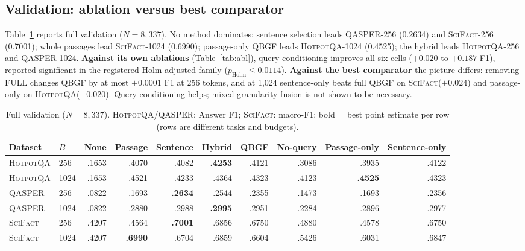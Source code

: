 \documentclass[10pt,twocolumn,letterpaper]{article}
\newcommand{\hotpot}{\textsc{HotpotQA}\xspace}
\newcommand{\qasper}{\textsc{QASPER}\xspace}
\newcommand{\scifact}{\textsc{SciFact}\xspace}
\newcommand{\SmallTable}{\footnotesize\setlength{\tabcolsep}{3.6pt}}
\begin{document}
\subsection{Validation: ablation versus best comparator}
Table~\ref{tab:val} reports full validation ($N{=}8{,}337$). No method dominates: sentence selection leads \qasper-256 (0.2634) and \scifact-256 (0.7001); whole passages lead \scifact-1024 (0.6990); passage-only QBGF leads \hotpot-1024 (0.4525); the hybrid leads \hotpot-256 and \qasper-1024. \textbf{Against its own ablations} (Table~\ref{tab:abl}), query conditioning improves all six cells ($+0.020$ to $+0.187$ F1), reported significant in the registered Holm-adjusted family ($p_{\mathrm{Holm}}\le0.0114$). \textbf{Against the best comparator} the picture differs: removing FULL changes QBGF by at most $\pm0.0001$ F1 at 256 tokens, and at 1,024 sentence-only beats full QBGF on \scifact ($+0.024$) and passage-only on \hotpot ($+0.020$). Query conditioning helps; mixed-granularity fusion is not shown to be necessary.

\begin{table}[t]\centering\SmallTable
\caption{Full validation ($N{=}8{,}337$). \hotpot/\qasper: Answer F1; \scifact: macro-F1; bold = best point estimate per row (rows are different tasks and budgets).}\label{tab:val}
\begin{tabular}{llrrrrrrrr}\toprule
Dataset & $B$ & None & Passage & Sentence & Hybrid & QBGF & No-query & Passage-only & Sentence-only\\\midrule
\hotpot & 256 & .1653 & .4070 & .4082 & \textbf{.4253} & .4121 & .3086 & .3935 & .4122\\
\hotpot & 1024 & .1653 & .4521 & .4233 & .4364 & .4323 & .4123 & \textbf{.4525} & .4323\\
\qasper & 256 & .0822 & .1693 & \textbf{.2634} & .2544 & .2355 & .1473 & .1693 & .2356\\
\qasper & 1024 & .0822 & .2880 & .2988 & \textbf{.2995} & .2951 & .2284 & .2896 & .2977\\
\scifact & 256 & .4207 & .4564 & \textbf{.7001} & .6856 & .6750 & .4880 & .4578 & .6750\\
\scifact & 1024 & .4207 & \textbf{.6990} & .6704 & .6859 & .6604 & .5426 & .6031 & .6847\\\bottomrule
\end{tabular}\end{table}
\end{document}
